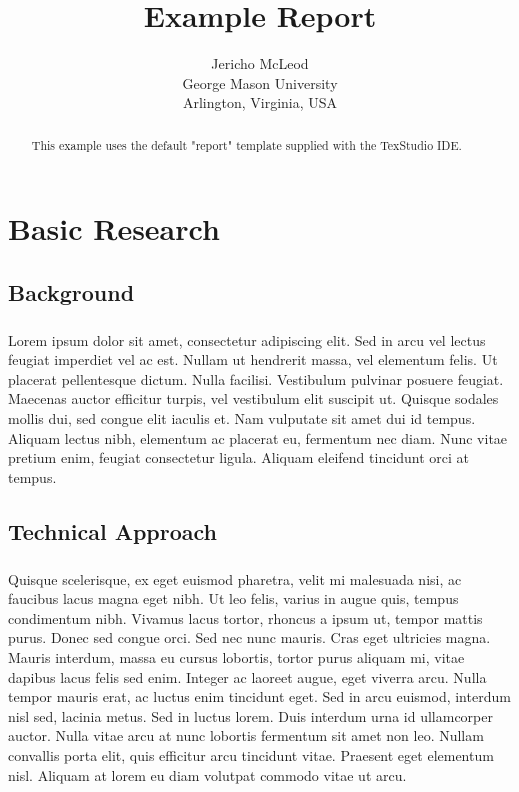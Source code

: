 \documentclass[11pt]{report}
\title{Example Report}
\author{Jericho McLeod\\
			 George Mason University\\
		 	 Arlington, Virginia, USA}
\begin{document}
\maketitle

\begin{abstract}
	This example uses the default "report" template supplied with the TexStudio IDE.
\end{abstract}

\chapter{Basic Research}

\section{Background}
\paragraph{}
Lorem ipsum dolor sit amet, consectetur adipiscing elit. Sed in arcu vel lectus feugiat imperdiet vel ac est. Nullam ut hendrerit massa, vel elementum felis. Ut placerat pellentesque dictum. Nulla facilisi. Vestibulum pulvinar posuere feugiat. Maecenas auctor efficitur turpis, vel vestibulum elit suscipit ut. Quisque sodales mollis dui, sed congue elit iaculis et. Nam vulputate sit amet dui id tempus. Aliquam lectus nibh, elementum ac placerat eu, fermentum nec diam. Nunc vitae pretium enim, feugiat consectetur ligula. Aliquam eleifend tincidunt orci at tempus.


\section{Technical Approach}
\paragraph{}
Quisque scelerisque, ex eget euismod pharetra, velit mi malesuada nisi, ac faucibus lacus magna eget nibh. Ut leo felis, varius in augue quis, tempus condimentum nibh. Vivamus lacus tortor, rhoncus a ipsum ut, tempor mattis purus. Donec sed congue orci. Sed nec nunc mauris. Cras eget ultricies magna. Mauris interdum, massa eu cursus lobortis, tortor purus aliquam mi, vitae dapibus lacus felis sed enim. Integer ac laoreet augue, eget viverra arcu. Nulla tempor mauris erat, ac luctus enim tincidunt eget. Sed in arcu euismod, interdum nisl sed, lacinia metus. Sed in luctus lorem. Duis interdum urna id ullamcorper auctor. Nulla vitae arcu at nunc lobortis fermentum sit amet non leo. Nullam convallis porta elit, quis efficitur arcu tincidunt vitae. Praesent eget elementum nisl. Aliquam at lorem eu diam volutpat commodo vitae ut arcu.
\end{document}
